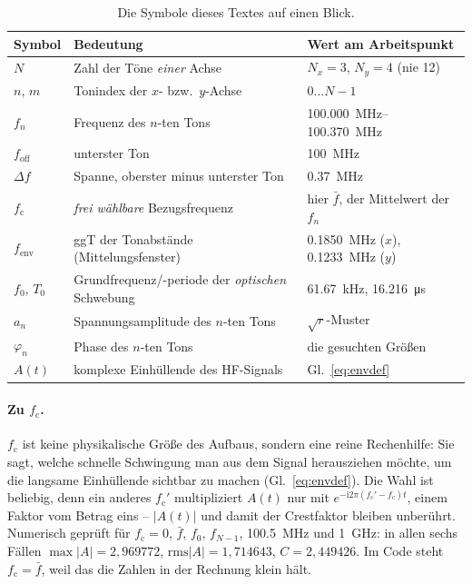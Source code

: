 \documentclass[11pt,a4paper]{article}
\newcommand{\crest}{\ensuremath{C}}
\begin{document}
\begin{table}[htb]
  \centering
  \caption{Die Symbole dieses Textes auf einen Blick.}
  \label{tab:symbols}
  \begin{tabular}{@{}p{}p{}p{}@{}}
    \toprule
    Symbol & Bedeutung & Wert am Arbeitspunkt\\
    \midrule
    $N$ & Zahl der Töne \emph{einer} Achse & $N_x=3$, $N_y=4$ (nie 12)\\
    $n$, $m$ & Tonindex der $x$- bzw.\ $y$-Achse & $0\dots N-1$\\
    $f_n$ & Frequenz des $n$-ten Tons & \SIrange{100.000}{100.370}{\mega\hertz}\\
    $f_\mathrm{off}$ & unterster Ton & \SI{100}{\mega\hertz}\\
    $\Delta f$ & Spanne, oberster minus unterster Ton & \SI{0.37}{\mega\hertz}\\
    $f_\mathrm{c}$ & \emph{frei wählbare} Bezugsfrequenz &
      hier $\bar f$, der Mittelwert der $f_n$\\
    $f_\mathrm{env}$ & ggT der Tonabstände (Mittelungsfenster) &
      \SI{0.1850}{\mega\hertz} ($x$), \SI{0.1233}{\mega\hertz} ($y$)\\
    $f_0$, $T_0$ & Grundfrequenz/-periode der \emph{optischen} Schwebung &
      \SI{61.67}{\kilo\hertz}, \SI{16.216}{\micro\second}\\
    $a_n$ & Spannungsamplitude des $n$-ten Tons & $\sqrt{r}$-Muster\\
    $\varphi_n$ & Phase des $n$-ten Tons & die gesuchten Größen\\
    $A(t)$ & komplexe Einhüllende des HF-Signals & Gl.~\eqref{eq:envdef}\\
    \bottomrule
  \end{tabular}
\end{table}

\paragraph{Zu \boldmath$f_\mathrm{c}$.}
$f_\mathrm{c}$ ist keine physikalische Größe des Aufbaus, sondern eine reine
Rechenhilfe: Sie sagt, welche schnelle Schwingung man aus dem Signal
herausziehen möchte, um die langsame Einhüllende sichtbar zu machen
(Gl.~\eqref{eq:envdef}). Die Wahl ist beliebig, denn ein anderes
$f_\mathrm{c}'$ multipliziert $A(t)$ nur mit
$e^{-\mathrm{i}2\pi(f_\mathrm{c}'-f_\mathrm{c})t}$, einem Faktor vom Betrag
eins -- $|A(t)|$ und damit der Crestfaktor bleiben unberührt. Numerisch
geprüft für $f_\mathrm{c} = 0$, $\bar f$, $f_0$, $f_{N-1}$,
\SI{100.5}{\mega\hertz} und \SI{1}{\giga\hertz}: in allen sechs Fällen
$\max|A| = 2{,}969772$, $\mathrm{rms}|A| = 1{,}714643$,
$\crest = 2{,}449426$. Im Code steht $f_\mathrm{c} = \bar f$, weil das die
Zahlen in der Rechnung klein hält.
\end{document}
